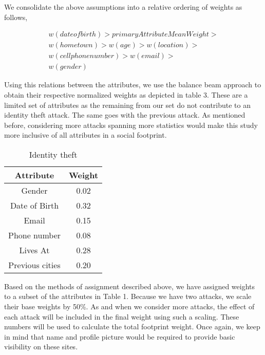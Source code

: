 \documentclass[10pt,conference]{IEEEtran}
\begin{document}
We consolidate the above assumptions into a relative ordering of weights as follows,

\begin{align*}
w(date of birth) > primaryAttributeMeanWeight > \\
w(home town) > w(age) > w(location) > \\
w(cell phone number) > w(email) > \\
w(gender)
\end{align*}

Using this relations between the attributes, we use the balance beam approach to obtain their respective normalized weights as depicted in table 3. These are a limited set of attributes as the remaining from our set do not contribute to an identity theft attack. The same goes with the previous attack. As mentioned before, considering more attacks spanning more statistics would make this study more inclusive of all attributes in a social footprint.\\

\begin{table}
	\normalsize
	\centering
 		\begin{tabular}{|| c | c ||} 
 		\hline
 		Attribute & Weight \\  
		\hline\hline
		Gender &  0.02 \\
		\hline
		Date of Birth &  0.32\\
		\hline
		Email &  0.15 \\
		\hline
		Phone number &  0.08\\
		\hline
		Lives At &  0.28\\
		\hline
		Previous cities &  0.20\\
		\hline
	\end{tabular}
\caption{Identity theft}
\end{table}

Based on the methods of assignment described above, we have assigned weights to a subset of the attributes in Table 1. Because we have two attacks, we scale their base weights by 50\%. As and when we consider more attacks, the effect of each attack will be included in the final weight using such a scaling. These numbers will be used to calculate the total footprint weight. Once again, we keep in mind that name and profile picture would be required to provide basic visibility on these sites. 
\end{document}
